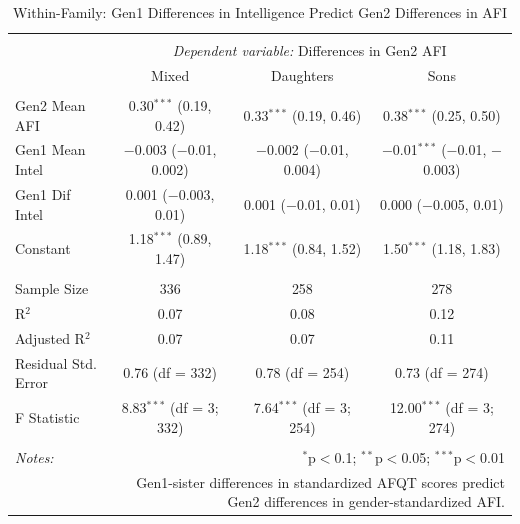 \documentclass[a4paper,man,apacite,natbib,12pt,longtable]{apa6}\usepackage[]{graphicx}\usepackage[]{color}
\begin{document}
\begin{landscape}
\begin{longtable}{@{\extracolsep{5pt}}lccc} 
\caption{Within-Family: Gen1 Differences in Intelligence Predict Gen2 Differences in AFI}\label{table_Dif_Mom_Intelligence_Dif_Child_AFI_9}
\\[-1.8ex]\hline 
\hline \\[-3.8ex] 
& \multicolumn{3}{c}{\textit{Dependent variable:} Differences in Gen2 AFI} \\ 
\cline{2-4}
 & Mixed & Daughters & Sons \\ 
\hline \\[-1.8ex] 
 Gen2 Mean AFI & 0.30$^{***}$ (0.19, 0.42) & 0.33$^{***}$ (0.19, 0.46) & 0.38$^{***}$ (0.25, 0.50) \\ 
  Gen1 Mean Intel & $-$0.003 ($-$0.01, 0.002) & $-$0.002 ($-$0.01, 0.004) & $-$0.01$^{***}$ ($-$0.01, $-$0.003) \\ 
  Gen1 Dif Intel & 0.001 ($-$0.003, 0.01) & 0.001 ($-$0.01, 0.01) & 0.000 ($-$0.005, 0.01) \\ 
  Constant & 1.18$^{***}$ (0.89, 1.47) & 1.18$^{***}$ (0.84, 1.52) & 1.50$^{***}$ (1.18, 1.83) \\ 
 \hline \\[-1.8ex] 
Sample Size & 336 & 258 & 278 \\ 
R$^{2}$ & 0.07 & 0.08 & 0.12 \\ 
Adjusted R$^{2}$ & 0.07 & 0.07 & 0.11 \\ 
Residual Std. Error & 0.76 (df = 332) & 0.78 (df = 254) & 0.73 (df = 274) \\ 
F Statistic & 8.83$^{***}$ (df = 3; 332) & 7.64$^{***}$ (df = 3; 254) & 12.00$^{***}$ (df = 3; 274) \\ 
\hline \\[-5ex]
\textit{Notes:}  & \multicolumn{3}{r}{$^{*}$p$<$0.1; $^{**}$p$<$0.05; $^{***}$p$<$0.01} \\[2ex]
& \multicolumn{3}{r}{\parbox{.6\linewidth}{\footnotesize Gen1-sister differences in standardized AFQT scores predict Gen2 differences in gender-standardized AFI.}} \\ 
\end{longtable}\pagebreak


\end{landscape}
\end{document}

